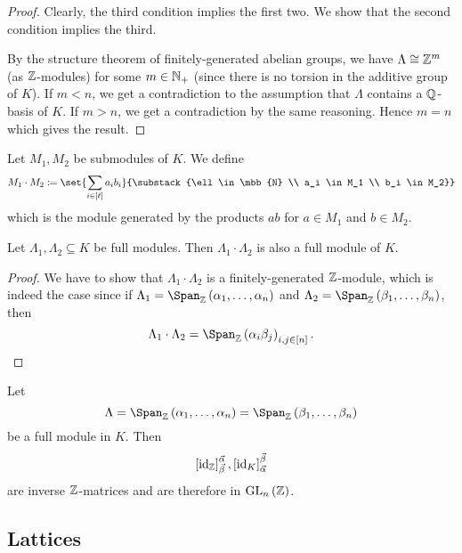 \documentclass[11pt]{karticle}
\begin{document}
\begin{proof}
Clearly, the third condition implies the first two. We show that the second condition implies the third.

By the structure theorem of finitely-generated abelian groups, we have $\Lambda \cong \mathbb{Z}^m$ (as $\mathbb{Z}$-modules) for some $m \in \mathbb{N}_+$ (since there is no torsion in the additive group of $K$).
If $m < n$, we get a contradiction to the assumption that $\Lambda$ contains a $\mathbb{Q}$-basis of $K$.
If $m > n$, we get a contradiction by the same reasoning.
Hence $m = n$ which gives the result.
\end{proof}

\begin{definition}
Let $M_1, M_2$ be submodules of $K$. We define
\[M_1 \cdot M_2 \coloneqq \set{\sum_{i \in \brs{\ell}} a_i b_i}{\substack{\ell \in \mbb{N} \\ a_i \in M_1 \\ b_i \in M_2}}\]
which is the module generated by the products $a b$ for $a \in M_1$ and $b \in M_2$.
\end{definition}

\begin{proposition}
Let $\Lambda_1, \Lambda_2 \subseteq K$ be full modules. Then $\Lambda_1 \cdot \Lambda_2$ is also a full module of $K$.
\end{proposition}

\begin{proof}
We have to show that $\Lambda_1 \cdot \Lambda_2$ is a finitely-generated $\mathbb{Z}$-module, which is indeed the case since if $\Lambda_1 = \Span_{\mbb{Z}}\prs{\alpha_1, \ldots, \alpha_n}$ and $\Lambda_2 = \Span_{\mbb{Z}}\prs{\beta_1, \ldots, \beta_n}$, then
\[\Lambda_1 \cdot \Lambda_2 = \Span_{\mbb{Z}}\prs{\alpha_i \beta_j}_{i,j \in [n]} \text{.}\]
\end{proof}

\begin{proposition}
Let \[\Lambda = \Span_{\mbb{Z}}\prs{\alpha_1, \ldots, \alpha_n} = \Span_{\mbb{Z}}\prs{\beta_1, \ldots, \beta_n}\] be a full module in $K$. Then
\[\left[ \operatorname{id}_{\mathbb{Z}} \right]^{\vec{\alpha}}_{\vec{\beta}}, \left[ \operatorname{id}_K \right]^{\vec{\beta}}_{\vec{\alpha}}\]
are inverse $\mathbb{Z}$-matrices and are therefore in $\mathrm{GL}_n\left( \mathbb{Z} \right)$.
\end{proposition}

\subsection{Lattices}
\end{document}
